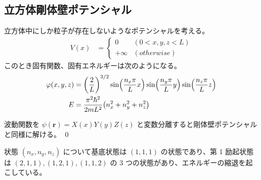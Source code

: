 \documentclass[uplatex,dvipdfmx,a4paper,11pt]{jlreq}
\makeatletter
\newcommand{\rr}{\bm{r}}
\numberwithin{equation}{section}
\theoremstyle{definition}
\renewenvironment{proof}[1][\proofname]{\par
  \normalfont
  \topsep6\p@\@plus6\p@ \trivlist
  \item[\hskip\labelsep{\bfseries #1}\@addpunct{\bfseries}]\ignorespaces\quad\par
}{%
  \qed\endtrivlist\@endpefalse
}
\renewcommand\proofname{証明}
\makeatother
\begin{document}
\subsection{立方体剛体壁ポテンシャル}
\begin{proposition}
  立方体中にしか粒子が存在しないようなポテンシャルを考える。
  \begin{align}
    V(x) & = \begin{cases}
               0        & (0 < x, y, z < L) \\
               + \infty & (otherwise)
             \end{cases}
  \end{align}
  このとき固有関数、固有エネルギーは次のようになる。
  \begin{align}
    \varphi(x, y, z) & = \qty(\frac{2}{L})^{3/2}\sin(\frac{n_x\pi}{L}x)\sin(\frac{n_y\pi}{L}y)\sin(\frac{n_z\pi}{L}z) \\
    E                & = \frac{\pi^2\hbar^2}{2mL^2}\qty(n_x^2 + n_y^2 + n_z^2)
  \end{align}
\end{proposition}
\begin{proof}
  波動関数を $\psi(\rr) = X(x)Y(y)Z(z)$ と変数分離すると剛体壁ポテンシャルと同様に解ける。
\end{proof}

状態 $(n_x, n_y, n_z)$ について基底状態は $(1, 1, 1)$ の状態であり、第 1 励起状態は $(2, 1, 1), (1, 2, 1), (1, 1, 2)$ の 3 つの状態があり、エネルギーの縮退を起こしている。
\end{document}
